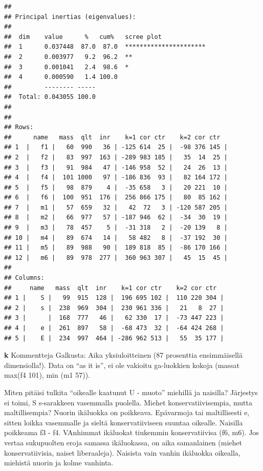 \documentclass[
  finnish,
]{book}
\begin{document}
\begin{verbatim}
## 
## Principal inertias (eigenvalues):
## 
##  dim    value      %   cum%   scree plot               
##  1      0.037448  87.0  87.0  **********************   
##  2      0.003977   9.2  96.2  **                       
##  3      0.001041   2.4  98.6  *                        
##  4      0.000590   1.4 100.0                           
##         -------- -----                                 
##  Total: 0.043055 100.0                                 
## 
## 
## Rows:
##      name   mass  qlt  inr    k=1 cor ctr    k=2 cor ctr  
## 1  |   f1 |   60  990   36 | -125 614  25 |  -98 376 145 |
## 2  |   f2 |   83  997  163 | -289 983 185 |   35  14  25 |
## 3  |   f3 |   91  984   47 | -146 958  52 |   24  26  13 |
## 4  |   f4 |  101 1000   97 | -186 836  93 |   82 164 172 |
## 5  |   f5 |   98  879    4 |  -35 658   3 |   20 221  10 |
## 6  |   f6 |  100  951  176 |  256 866 175 |   80  85 162 |
## 7  |   m1 |   57  659   32 |   42  72   3 | -120 587 205 |
## 8  |   m2 |   66  977   57 | -187 946  62 |  -34  30  19 |
## 9  |   m3 |   78  457    5 |  -31 318   2 |  -20 139   8 |
## 10 |   m4 |   89  674   14 |   58 482   8 |  -37 192  30 |
## 11 |   m5 |   89  988   90 |  189 818  85 |  -86 170 166 |
## 12 |   m6 |   89  978  277 |  360 963 307 |   45  15  45 |
## 
## Columns:
##     name   mass  qlt  inr    k=1 cor ctr    k=2 cor ctr  
## 1 |    S |   99  915  128 |  196 695 102 |  110 220 304 |
## 2 |    s |  238  969  304 |  230 961 336 |   21   8  27 |
## 3 |      |  168  777   46 |   62 330  17 |  -73 447 223 |
## 4 |    e |  261  897   58 |  -68 473  32 |  -64 424 268 |
## 5 |    E |  234  997  464 | -286 962 513 |   55  35 177 |
\end{verbatim}

\textbf{k} Kommentteja Galkusta:
Aika yksiuloitteinen (87 prosenttia ensimmäisellä dimensiolla!). Data on
``as it is'', ei ole vakioitu ga-luokkien kokoja (massat max(f4 101), min (m1 57)).

Miten pitäisi tulkita ``oikealle kaatunut U - muoto'' miehillä ja naisilla?
Järjestys ei toimi, S s-sarakkeen vasemmalla puolella. Miehet konservatiivisempia,
mutta maltillisempia? Nuorin ikäluokka on poikkeava. Epävarmoja tai maltillisesti
e, sitten loikka vasemmalle ja sieltä konservatiiviseen suuntaa oikealle. Naisilla
poikkeama f3 - f4. VAnhimmat ikäluokat tiukemmin konservatiivisa (f6, m6). Jos
vertaa sukupuolten eroja samassa ikäluokassa, on aika samanlainen (miehet
konservatiivisia, naiset liberaaleja). Naisista vain vanhin ikäluokka oikealla,
miehistä nuorin ja kolme vanhinta.
\end{document}
